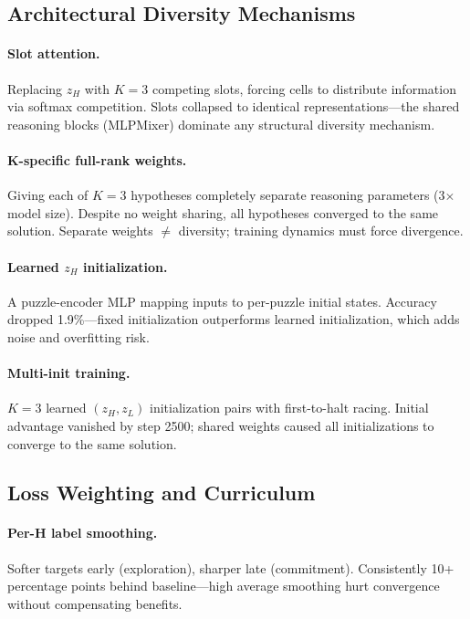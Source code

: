 \subsection{Architectural Diversity Mechanisms}

\paragraph{Slot attention.} Replacing $z_H$ with $K{=}3$ competing slots, forcing
cells to distribute information via softmax competition. Slots collapsed to
identical representations---the shared reasoning blocks (MLPMixer) dominate any
structural diversity mechanism.

\paragraph{K-specific full-rank weights.} Giving each of $K{=}3$ hypotheses
completely separate reasoning parameters (3$\times$ model size). Despite no
weight sharing, all hypotheses converged to the same solution. Separate weights
$\neq$ diversity; training dynamics must force divergence.

\paragraph{Learned $z_H$ initialization.} A puzzle-encoder MLP mapping inputs
to per-puzzle initial states. Accuracy dropped 1.9\%---fixed initialization
outperforms learned initialization, which adds noise and overfitting risk.

\paragraph{Multi-init training.} $K{=}3$ learned $(z_H, z_L)$ initialization pairs
with first-to-halt racing. Initial advantage vanished by step 2500; shared
weights caused all initializations to converge to the same solution.

\subsection{Loss Weighting and Curriculum}

\paragraph{Per-H label smoothing.} Softer targets early (exploration), sharper
late (commitment). Consistently 10+ percentage points behind baseline---high
average smoothing hurt convergence without compensating benefits.

